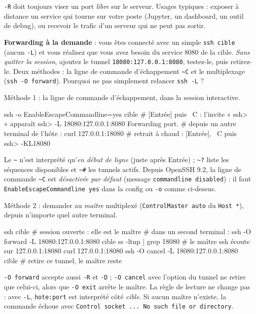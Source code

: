 \documentclass[a4paper,10pt]{exam}
\begin{document}
\begin{questions}
\begin{solution}
\texttt{-R} doit toujours viser un port \emph{libre} sur le serveur.
Usages typiques : exposer à distance un service qui tourne sur votre poste (Jupyter, un
dashboard, un outil de debug), ou recevoir le trafic d'un serveur qui ne peut pas sortir.
\end{solution}
\question \textbf{Forwarding à la demande} : vous êtes connecté avec un simple
\texttt{ssh cible} (aucun \texttt{-L}) et vous réalisez que vous avez besoin du service
8080 de la cible. \emph{Sans quitter la session}, ajoutez le tunnel
\texttt{18080:127.0.0.1:8080}, testez-le, puis retirez-le. Deux méthodes : la ligne de
commande d'échappement \texttt{\textasciitilde C} et le multiplexage
(\texttt{ssh -O forward}). Pourquoi ne pas simplement relancer \texttt{ssh -L} ?
\begin{solution}
Méthode 1 : la ligne de commande d'échappement, dans la session interactive.
\begin{bashcode}
ssh -o EnableEscapeCommandline=yes cible
# [Entrée] puis ~C : l'invite « ssh> » apparaît
ssh> -L 18080:127.0.0.1:8080
Forwarding port.
# depuis un autre terminal de l'hôte :
curl 127.0.0.1:18080
# retrait à chaud : [Entrée], ~C puis
ssh> -KL18080
\end{bashcode}
Le \texttt{\textasciitilde} n'est interprété qu'\emph{en début de ligne} (juste après
Entrée) ; \texttt{\textasciitilde ?} liste les séquences disponibles et
\texttt{\textasciitilde \#} les tunnels actifs. Depuis OpenSSH 9.2, la ligne de commande
\texttt{\textasciitilde C} est \emph{désactivée par défaut} (message
\texttt{commandline disabled}) : il faut \texttt{EnableEscapeCommandline yes} dans la
config ou \texttt{-o} comme ci-dessus.

Méthode 2 : demander au \emph{maître} multiplexé (\texttt{ControlMaster auto} du
\texttt{Host *}), depuis n'importe quel autre terminal.
\begin{bashcode}
ssh cible                      # session ouverte : elle est le maître
# dans un second terminal :
ssh -O forward -L 18080:127.0.0.1:8080 cible
ss -ltnp | grep 18080          # le maître ssh écoute sur 127.0.0.1:18080
curl 127.0.0.1:18080
ssh -O cancel -L 18080:127.0.0.1:8080 cible   # retire ce tunnel, le maître reste
\end{bashcode}
\texttt{-O forward} accepte aussi \texttt{-R} et \texttt{-D} ; \texttt{-O cancel} avec
l'option du tunnel ne retire que celui-ci, alors que \texttt{-O exit} arrête le maître.
La règle de lecture ne change pas : avec \texttt{-L}, \texttt{hote:port} est interprété
côté \emph{cible}. Si aucun maître n'existe, la commande échoue avec
\texttt{Control socket ... No such file or directory}.


\end{solution}
\end{questions}
\end{document}
